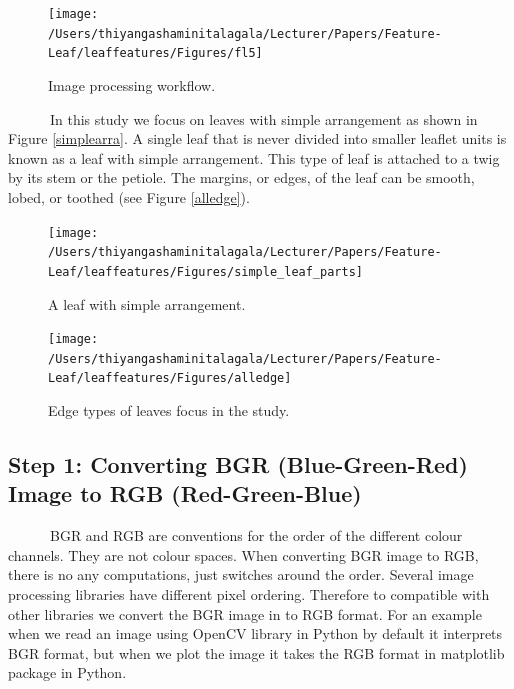 \documentclass{article}
\begin{document}
\begin{figure}[!ht]

{\centering \texttt{[image: /Users/thiyangashaminitalagala/Lecturer/Papers/Feature-Leaf/leaffeatures/Figures/fl5]} 

}

\caption{\label{figtest2}Image processing workflow.}\label{fig:unnamed-chunk-2}
\end{figure}

~~~~~~In this study we focus on leaves with simple arrangement as shown
in Figure \ref{simplearra}. A single leaf that is never divided into
smaller leaflet units is known as a leaf with simple arrangement. This
type of leaf is attached to a twig by its stem or the petiole. The
margins, or edges, of the leaf can be smooth, lobed, or toothed (see
Figure \ref{alledge}).

\begin{figure}[!ht]

{\centering \texttt{[image: /Users/thiyangashaminitalagala/Lecturer/Papers/Feature-Leaf/leaffeatures/Figures/simple\_leaf\_parts]} 

}

\caption{\label{simplearra} A leaf with simple arrangement.}\label{fig:unnamed-chunk-3}
\end{figure}

\begin{figure}[!ht]

{\centering \texttt{[image: /Users/thiyangashaminitalagala/Lecturer/Papers/Feature-Leaf/leaffeatures/Figures/alledge]} 

}

\caption{\label{alledge} Edge types of leaves focus in the study.}\label{fig:unnamed-chunk-4}
\end{figure}

\hypertarget{step-1-converting-bgr-blue-green-red-image-to-rgb-red-green-blue}{%
\subsection{Step 1: Converting BGR (Blue-Green-Red) Image to RGB
(Red-Green-Blue)}\label{step-1-converting-bgr-blue-green-red-image-to-rgb-red-green-blue}}

~~~~~~BGR and RGB are conventions for the order of the different colour
channels. They are not colour spaces. When converting BGR image to RGB,
there is no any computations, just switches around the order. Several
image processing libraries have different pixel ordering. Therefore to
compatible with other libraries we convert the BGR image in to RGB
format. For an example when we read an image using OpenCV library in
Python by default it interprets BGR format, but when we plot the image
it takes the RGB format in matplotlib package in Python.
\end{document}
